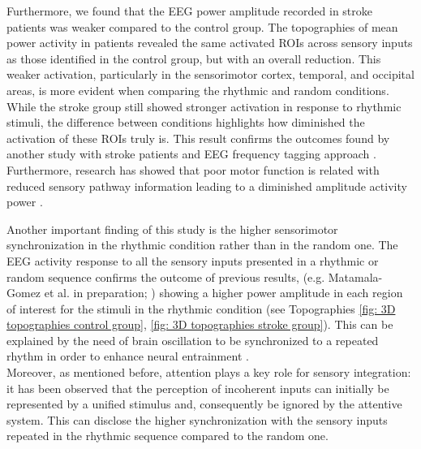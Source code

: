 Furthermore, we found that the EEG power amplitude recorded in stroke patients was weaker compared to the control group. The topographies of mean power activity in patients revealed the same activated ROIs across sensory inputs as those identified in the control group, but with an overall reduction. This weaker activation, particularly in the sensorimotor cortex, temporal, and occipital areas, is more evident when comparing the rhythmic and random conditions. While the stroke group still showed stronger activation in response to rhythmic stimuli, the difference between conditions highlights how diminished the activation of these ROIs truly is. This result confirms the outcomes found by another study with stroke patients and EEG frequency tagging approach \parencite{Nozaradan_2017}. Furthermore, research has showed that poor motor function is related with reduced sensory pathway information leading to a diminished amplitude activity power \parencite{Campfens_2015}. 

Another important finding of this study is the higher sensorimotor synchronization in the rhythmic condition rather than in the random one. The EEG activity response to all the sensory inputs presented in a rhythmic or random sequence confirms the outcome of previous results, (e.g. Matamala-Gomez et al. in preparation; \cite{Haegens_2018}) showing a higher power amplitude in each region of interest for the stimuli in the rhythmic condition (see Topographies \ref{fig: 3D topographies control group}, \ref{fig: 3D topographies stroke group}). This can be explained by the need of brain oscillation to be synchronized to a repeated rhythm in order to enhance neural entrainment \parencite{Rosso_2023}. \\
Moreover, as mentioned before, attention plays a key role for sensory integration: it has been observed that the perception of incoherent inputs can initially be represented by a unified stimulus \parencite{Bergam_1990} and, consequently be ignored by the attentive system. This can disclose the higher synchronization with the sensory inputs repeated in the rhythmic sequence compared to the random one. 

